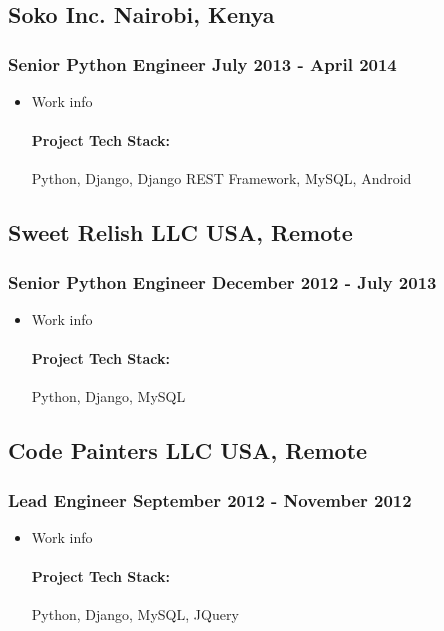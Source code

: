 \documentclass[11pt]{article} %
\begin{document}
\subsection{Soko Inc. \hfill Nairobi, Kenya}
\subsubsection{Senior Python Engineer \hfill  July 2013 - April 2014}
\begin{itemize}
    \item Work info
    \paragraph{Project Tech Stack:} Python, Django, Django REST Framework, MySQL, Android
\end{itemize}

\subsection{Sweet Relish LLC \hfill USA, Remote}
\subsubsection{Senior Python Engineer \hfill  December 2012 - July 2013}
\begin{itemize}
    \item Work info
    \paragraph{Project Tech Stack:} Python, Django, MySQL
\end{itemize}

\subsection{Code Painters LLC \hfill USA, Remote}
\subsubsection{Lead Engineer \hfill  September 2012 - November 2012}
\begin{itemize}
    \item Work info
    \paragraph{Project Tech Stack:} Python, Django, MySQL, JQuery
\end{itemize}
\end{document}
